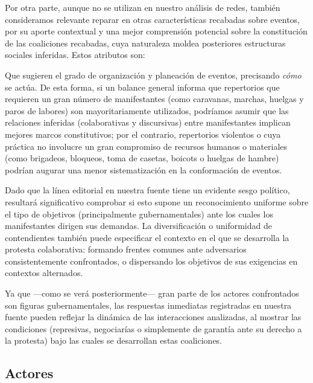 \documentclass[letterpaper, 11pt]{book}
\theoremstyle{definition}
\theoremstyle{remark}
\begin{document}
Por otra parte, aunque no se utilizan en nuestro análisis de redes, también consideramos relevante reparar en otras características recabadas sobre eventos, por su aporte contextual y una mejor comprensión potencial sobre la constitución de las coaliciones recabadas, cuya naturaleza moldea posteriores estructuras sociales inferidas. 
Estos atributos son:
\begin{description}
    \setlength\itemsep{0em}
    \item[Repertorios de protesta.] 
    Que sugieren el grado de organización y planeación de eventos, precisando \emph{cómo} se actúa. 
    De esta forma, si un balance general informa que repertorios que requieren un gran número de manifestantes (como caravanas, marchas, huelgas y paros de labores) son mayoritariamente utilizados, podríamos asumir que las relaciones inferidas (colaborativas y discursivas) entre manifestantes implican mejores marcos constitutivos; por el contrario, repertorios violentos o cuya práctica no involucre un gran compromiso de recursos humanos o materiales (como brigadeos, bloqueos, toma de casetas, boicots o huelgas de hambre) podrían augurar una menor sistematización en la conformación de eventos. 
    \item[Objetivos.] 
    Dado que la línea editorial en nuestra fuente tiene un evidente sesgo político, resultará significativo comprobar si esto supone un reconocimiento uniforme sobre el tipo de objetivos  (principalmente gubernamentales) ante los cuales los manifestantes dirigen sus demandas. 
    La diversificación o uniformidad de contendientes también puede especificar el contexto en el que se desarrolla la protesta colaborativa: formando frentes comunes ante adversarios consistentemente confrontados, o dispersando los objetivos de sus exigencias en contextos alternados. 
    \item[Respuestas a la protesta.]  
    Ya que ---como se verá posteriormente--- gran parte de los actores confrontados son figuras gubernamentales, las respuestas inmediatas registradas en nuestra fuente pueden reflejar la dinámica de las interacciones analizadas, al mostrar las condiciones (represivas, negociarías o simplemente de garantía ante su derecho a la protesta) bajo las cuales se desarrollan estas coaliciones.
\end{description}



\subsection{Actores}
\label{sec:actores}
\end{document}
